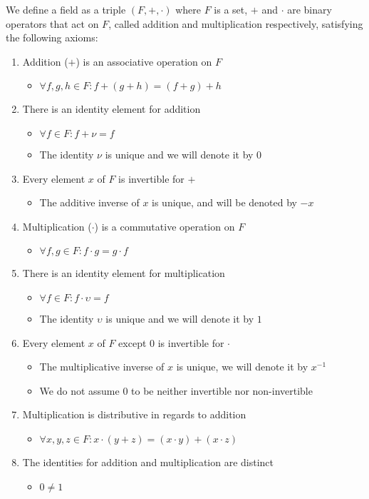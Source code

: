 \documentclass{article}
\begin{document}
We define a field as a triple $(F,+,\cdot)$ where $F$ is a set, $+$ and $\cdot$
are binary operators that act on $F$, called addition and multiplication
respectively, satisfying the following axioms:
\begin{enumerate}
  \item Addition ($+$) is an associative operation on $F$
  \begin{itemize}
    \item $\forall f,g,h \in F : f+(g+h) = (f+g)+h$
  \end{itemize}
  \item There is an identity element for addition
  \begin{itemize}
    \item $\forall f \in F: f + \nu = f$
    \item The identity $\nu$ is unique and we will denote it by   $0$
  \end{itemize}
  \item Every element $x$ of $F$ is invertible for $+$
  \begin{itemize}
    \item The additive inverse of $x$ is unique, and will be denoted by $-x$
  \end{itemize}
  \item Multiplication ($\cdot$) is a commutative operation on $F$
  \begin{itemize}
    \item $\forall f,g \in F : f \cdot g = g \cdot f$
  \end{itemize}
  \item There is an identity element for multiplication
  \begin{itemize}
    \item $\forall f \in F: f \cdot \upsilon = f$
    \item The identity $\upsilon$ is unique and we will denote it by $1$
  \end{itemize}
  \item Every element $x$ of $F$ except $0$ is invertible for $\cdot$
  \begin{itemize}
    \item The multiplicative inverse of $x$ is unique, we will denote it by
          $x^{-1}$
    \item We do not assume $0$ to be neither invertible nor non-invertible
  \end{itemize}
  \item Multiplication is distributive in regards to addition
  \begin{itemize}
    \item $\forall x,y,z \in F : x \cdot (y + z) = (x \cdot y) + (x \cdot z)$
  \end{itemize}
  \item The identities for addition and multiplication are distinct
  \begin{itemize}
    \item $0 \neq 1$
  \end{itemize}
\end{enumerate}
\end{document}
